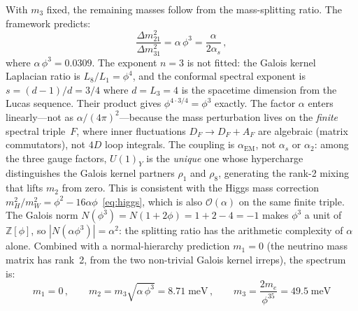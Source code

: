 \documentclass[12pt,a4paper]{article}
\theoremstyle{definition}
\begin{document}
With $m_3$ fixed, the remaining masses follow from the mass-splitting ratio.  The framework predicts:
\begin{equation}
\frac{\Delta m^2_{21}}{\Delta m^2_{31}} = \alpha\,\phi^3 = \frac{\alpha}{2\alpha_s}\,,
\label{eq:dm_ratio}
\end{equation}
where $\alpha\,\phi^3 = 0.0309$.  The exponent $n = 3$ is not fitted: the Galois kernel Laplacian ratio is $L_8/L_1 = \phi^4$, and the conformal spectral exponent is $s = (d-1)/d = 3/4$ where $d = L_3 = 4$ is the spacetime dimension from the Lucas sequence.  Their product gives $\phi^{4 \cdot 3/4} = \phi^3$ exactly.  The factor $\alpha$ enters linearly---not as $\alpha/(4\pi)^2$---because the mass perturbation lives on the \emph{finite} spectral triple~$F$, where inner fluctuations $D_F \to D_F + A_F$ are algebraic (matrix commutators), not $4D$ loop integrals.  The coupling is $\alpha_{\text{EM}}$, not $\alpha_s$ or $\alpha_2$: among the three gauge factors, $U(1)_Y$ is the \emph{unique} one whose hypercharge distinguishes the Galois kernel partners $\rho_1$ and $\rho_8$, generating the rank-2 mixing that lifts $m_2$ from zero.  This is consistent with the Higgs mass correction $m_H^2/m_W^2 = \phi^2 - 16\alpha\phi$~\eqref{eq:higgs}, which is also $\mathcal{O}(\alpha)$ on the same finite triple.  The Galois norm $N(\phi^3) = N(1 + 2\phi) = 1 + 2 - 4 = -1$ makes $\phi^3$ a unit of~$\mathbb{Z}[\phi]$, so $|N(\alpha\phi^3)| = \alpha^2$: the splitting ratio has the arithmetic complexity of $\alpha$ alone.  Combined with a normal-hierarchy prediction $m_1 = 0$ (the neutrino mass matrix has rank~2, from the two non-trivial Galois kernel irreps), the spectrum is:
\begin{equation}
\boxed{m_1 = 0\,,\qquad m_2 = m_3\sqrt{\alpha\,\phi^3} = 8.71\;\text{meV}\,,\qquad m_3 = \frac{2m_e}{\phi^{35}} = 49.5\;\text{meV}}
\label{eq:nu_spectrum}
\end{equation}
\end{document}
